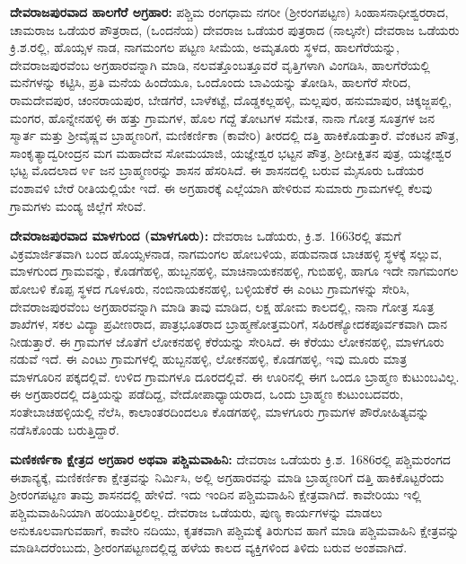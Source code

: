 \textbf{ದೇವರಾಜಪುರವಾದ ಹಾಲಗೆರೆ ಅಗ್ರಹಾರ:} ಪಶ್ಚಿಮ ರಂಗಧಾಮ ನಗರೀ (ಶ‍್ರೀರಂಗಪಟ್ಟಣ) ಸಿಂಹಾಸನಾಧೀಶ್ವರರಾದ, ಚಾಮರಾಜ ಒಡೆಯರ ಪೌತ್ರರಾದ, (ಒಂದನೆಯ) ದೇವರಾಜ ಒಡೆಯರ ಪುತ್ರರಾದ (ನಾಲ್ಕನೇ) ದೇವರಾಜ ಒಡೆಯರು ಕ್ರಿ.ಶ.ರಲ್ಲಿ, ಹೊಯ್ಸಳ ನಾಡ, ನಾಗಮಂಗಲ ಪಟ್ಟಣ ಸೀಮೆಯ, ಅಮೃತೂರು ಸ್ಥಳದ, ಹಾಲಗೆರೆಯನ್ನು, ದೇವರಾಜಪುರವೆಂಬ ಅಗ್ರಹಾರವನ್ನಾಗಿ ಮಾಡಿ, ನಲವತ್ತೊಂಬತ್ತೂವರೆ ವೃತ್ತಿಗಳಾಗಿ ವಿಂಗಡಿಸಿ, ಹಾಲಗೆರೆಯಲ್ಲಿ  ಮನೆಗಳನ್ನು ಕಟ್ಟಿಸಿ, ಪ್ರತಿ ಮನೆಯ ಹಿಂದೆಯೂ, ಒಂದೊಂದು ಬಾವಿಯನ್ನು ತೋಡಿಸಿ, ಹಾಲಗೆರೆ ಸೇರಿದ, ರಾಮದೇವಪುರ, ಚಂನರಾಯಪುರ, ಬೇಡಗೆರೆ, ಬಾಳೆಕಟ್ಟೆ, ದೊಡ್ಡಕಲ್ಲಹಳ್ಳಿ, ಮಲ್ಲಪುರ, ಹನುಮಾಪುರ, ಚಿಕ್ಕಜ್ಜಪಲ್ಲಿ, ಮಂಗರ, ಹೊನ್ನೇನಹಳ್ಳಿ ಈ ಹತ್ತು ಗ್ರಾಮಗಳ, ಹೊಲ ಗದ್ದೆ ತೋಟಗಳ ಸಮೇತ, ನಾನಾ ಗೋತ್ರ ಸೂತ್ರಗಳ  ಜನ ಸ್ಮಾರ್ತ ಮತ್ತು ಶ‍್ರೀವೈಷ್ಣವ ಬ್ರಾಹ್ಮಣರಿಗೆ, ಮಣಿಕರ್ಣಿಕಾ (ಕಾವೇರಿ) ತೀರದಲ್ಲಿ ದತ್ತಿ ಹಾಕಿಕೊಡುತ್ತಾರೆ. ವೆಂಕಟನ ಪೌತ್ರ, ಸಾಂಕೃತ್ಯಾದ್ವರೀಂದ್ರನ ಮಗ ಮಹಾದೇವ ಸೋಮಯಾಜಿ, ಯಜ್ಞೇಶ್ವರ ಭಟ್ಟನ ಪೌತ್ರ, ಶ‍್ರೀದೀಕ್ಷಿತನ ಪುತ್ರ, ಯಜ್ಞೇಶ್ವರ ಭಟ್ಟ ಮೊದಲಾದ ೪೯ ಜನ ಬ್ರಾಹ್ಮಣರನ್ನು ಶಾಸನ ಹೆಸರಿಸಿದೆ. ಈ ಶಾಸನದಲ್ಲಿ ಬರುವ ಮೈಸೂರು ಒಡೆಯರ ವಂಶಾವಳಿ ಬೇರೆ ರೀತಿಯಲ್ಲಿಯೇ ಇದೆ. ಈ ಅಗ್ರಹಾರಕ್ಕೆ ಎಲ್ಲೆಯಾಗಿ ಹೇಳಿರುವ ಸುಮಾರು  ಗ್ರಾಮಗಳಲ್ಲಿ ಕೆಲವು ಗ್ರಾಮಗಳು ಮಂಡ್ಯ ಜಿಲ್ಲೆಗೆ ಸೇರಿವೆ.

\textbf{ದೇವರಾಜಪುರವಾದ ಮಾಳಗುಂದ (ಮಾಳಗೂರು):} ದೇವರಾಜ ಒಡೆಯರು, ಕ್ರಿ.ಶ. 1663ರಲ್ಲಿ ತಮಗೆ ವಿಕ್ರಮಾರ್ಜಿತವಾಗಿ ಬಂದ ಹೊಯ್ಸಳನಾಡ, ನಾಗಮಂಗಲ ಹೋಬಳಿಯ, ಪಡುವನಾಡ ಬಾಚಹಳ್ಳಿ ಸ್ಥಳಕ್ಕೆ ಸಲ್ಲುವ, ಮಾಳಗುಂದ ಗ್ರಾಮವನ್ನು, ಕೊಡಗೆಹಳ್ಳಿ, ಹುಬ್ಬನಹಳ್ಳಿ, ಮಾಚಿನಾಯಕನಹಳ್ಳಿ, ಗುಬಿಹಳ್ಳಿ, ಹಾಗೂ ಇದೇ ನಾಗಮಂಗಲ ಹೋಬಳಿ ಕೊಪ್ಪ ಸ್ಥಳದ ಗೂಳೂರು, ನಂಬಿನಾಯಕನಹಳ್ಳಿ, ಬಳ್ಳಿಯಕೆರೆ ಈ ಎಂಟು ಗ್ರಾಮಗಳನ್ನು ಸೇರಿಸಿ, ದೇವರಾಜಪುರವೆಂಬ ಅಗ್ರಹಾರವನ್ನಾಗಿ ಮಾಡಿ ತಾವು ಮಾಡಿದ, ಲಕ್ಷ ಹೋಮ ಕಾಲದಲ್ಲಿ, ನಾನಾ ಗೋತ್ರ ಸೂತ್ರ ಶಾಖೆಗಳ, ಸಕಲ ವಿದ್ಯಾ ಪ್ರವೀಣರಾದ, ಪಾತ್ರಭೂತರಾದ ಬ್ರಾಹ್ಮಣೋತ್ತಮರಿಗೆ, ಸಹಿರಣ್ಯೋದಕಪೂರ್ವಕವಾಗಿ ದಾನ ನೀಡುತ್ತಾರೆ. ಈ ಗ್ರಾಮಗಳ ಜೊತೆಗೆ ಲೋಕನಹಳ್ಳಿ ಕೆರೆಯನ್ನು ಸೇರಿಸಿದೆ. ಈ ಕೆರೆಯು ಲೋಕನಹಳ್ಳಿ, ಮಾಳಗೂರು ನಡುವೆ ಇದೆ. ಈ ಎಂಟು ಗ್ರಾಮಗಳಲ್ಲಿ ಹುಬ್ಬನಹಳ್ಳಿ, ಲೋಕನಹಳ್ಳಿ, ಕೊಡಗಹಳ್ಳಿ, ಇವು ಮೂರು ಮಾತ್ರ ಮಾಳಗೂರಿನ ಪಕ್ಕದಲ್ಲಿವೆ. ಉಳಿದ ಗ್ರಾಮಗಳೂ ದೂರದಲ್ಲಿವೆ. ಈ ಊರಿನಲ್ಲಿ ಈಗ ಒಂದೂ ಬ್ರಾಹ್ಮಣ ಕುಟುಂಬವಿಲ್ಲ. ಈ ಅಗ್ರಹಾರದಲ್ಲಿ ದತ್ತಿಯನ್ನು ಪಡೆದಿದ್ದ, ವೇದೋಪಾಧ್ಯಾಯರಾದ, ಒಂದು ಬ್ರಾಹ್ಮಣ ಕುಟುಂಬದವರು, ಸಂತೇಬಾಚಹಳ್ಳಿಯಲ್ಲಿ ನೆಲೆಸಿ, ಕಾಲಾಂತರದಿಂದಲೂ ಕೊಡಗಹಳ್ಳಿ, ಮಾಳಗೂರು ಗ್ರಾಮಗಳ ಪೌರೋಹಿತ್ಯವನ್ನು ನಡೆಸಿಕೊಂಡು ಬರುತ್ತಿದ್ದಾರೆ.

\textbf{ಮಣಿಕರ್ಣಿಕಾ ಕ್ಷೇತ್ರದ ಅಗ್ರಹಾರ ಅಥವಾ ಪಶ್ಚಿಮವಾಹಿನಿ:} ದೇವರಾಜ ಒಡೆಯರು ಕ್ರಿ.ಶ. 1686ರಲ್ಲಿ ಪಶ್ಚಿಮರಂಗದ ಈಶಾನ್ಯಕ್ಕೆ, ಮಣಿಕರ್ಣಿಕಾ ಕ್ಷೇತ್ರವನ್ನು ನಿರ್ಮಿಸಿ, ಅಲ್ಲಿ ಅಗ್ರಹಾರವನ್ನು ಮಾಡಿ ಬ್ರಾಹ್ಮಣರಿಗೆ ದತ್ತಿ ಹಾಕಿಕೊಟ್ಟರೆಂದು ಶ‍್ರೀರಂಗಪಟ್ಟಣ ತಾಮ್ರ ಶಾಸನದಲ್ಲಿ ಹೇಳಿದೆ. ಇದು ಇಂದಿನ ಪಶ್ಚಿಮವಾಹಿನಿ ಕ್ಷೇತ್ರವಾಗಿದೆ. ಕಾವೇರಿಯು ಇಲ್ಲಿ ಪಶ್ಚಿಮವಾಹಿನಿಯಾಗಿ ಹರಿಯುತ್ತಿರಲಿಲ್ಲ. ದೇವರಾಜ ಒಡೆಯರು, ಪುಣ್ಯ ಕಾರ್ಯಗಳನ್ನು ಮಾಡಲು ಅನುಕೂಲವಾಗುವಹಾಗೆ, ಕಾವೇರಿ ನದಿಯು, ಕೃತಕವಾಗಿ ಪಶ್ಚಿಮಕ್ಕೆ ತಿರುಗುವ ಹಾಗೆ ಮಾಡಿ ಪಶ್ಚಿಮವಾಹಿನಿ ಕ್ಷೇತ್ರವನ್ನು ಮಾಡಿಸಿದರೆಂಬುದು, ಶ‍್ರೀರಂಗಪಟ್ಟಣದಲ್ಲಿದ್ದ ಹಳೆಯ ಕಾಲದ ವ್ಯಕ್ತಿಗಳಿಂದ ತಿಳಿದು ಬರುವ ಅಂಶವಾಗಿದೆ.

